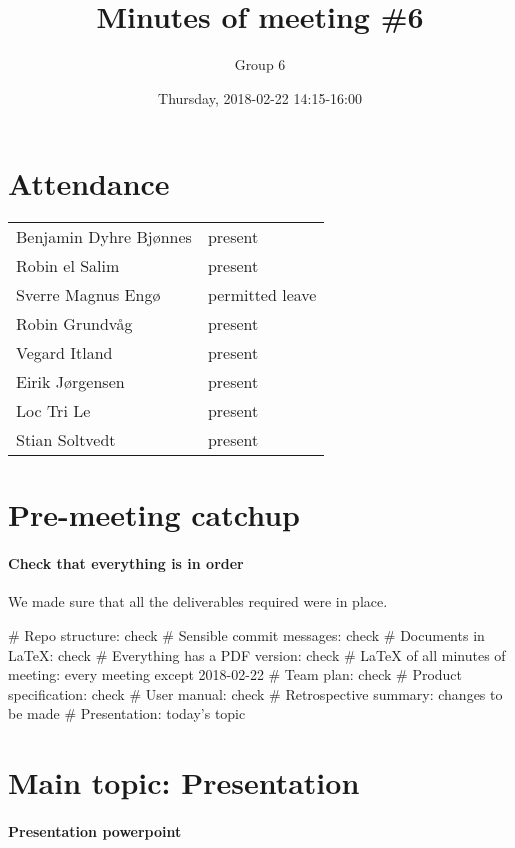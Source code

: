 \documentclass{article}
\title{Minutes of meeting \#6}
\author{Group 6}
\date{Thursday, 2018-02-22 14:15-16:00}
\begin{document}
\maketitle

\section{Attendance}
\begin{tabular}{l l}
    Benjamin Dyhre Bjønnes     & present \\
    Robin el Salim             & present \\
    Sverre Magnus Engø         & permitted leave \\
    Robin Grundvåg             & present \\
    Vegard Itland              & present \\
    Eirik Jørgensen            & present \\
    Loc Tri Le                 & present \\
    Stian Soltvedt             & present
\end{tabular}

\section{Pre-meeting catchup}

\paragraph{Check that everything is in order}

We made sure that all the deliverables required were in place.

\begin{easylist}[itemize]
    # Repo structure: check
    # Sensible commit messages: check
    # Documents in LaTeX: check
    # Everything has a PDF version: check
    # LaTeX of all minutes of meeting: every meeting except 2018-02-22
    # Team plan: check
    # Product specification: check
    # User manual: check
    # Retrospective summary: changes to be made
    # Presentation: today's topic
\end{easylist}

\section{Main topic: Presentation}

\paragraph{Presentation powerpoint}
\end{document}

